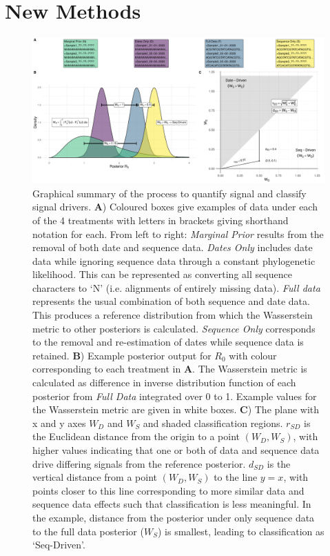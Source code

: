 \documentclass{article}
\begin{document}
\section*{New Methods}

\begin{figure}[H]
\centering
\includegraphics[width=1\linewidth]{../figures/graphicalMethods.pdf}
\caption{Graphical summary of the process to quantify signal and classify signal drivers.  \textbf{A}) Coloured boxes give examples of data under each of the 4 treatments with letters in brackets giving shorthand notation for each. From left to right: \emph{Marginal Prior} results from the removal of both date and sequence data. \emph{Dates Only} includes date data while ignoring sequence data through a constant phylogenetic likelihood. This can be represented as converting all sequence characters to `N' (i.e. alignments of entirely missing data). \emph{Full data} represents the usual combination of both sequence and date data. This produces a reference distribution from which the Wasserstein metric to other posteriors is calculated. \emph{Sequence Only} corresponds to the removal and re-estimation of dates while sequence data is retained. \textbf{B}) Example posterior output for $R_0$ with colour corresponding to each treatment in \textbf{A}. The Wasserstein metric is calculated as difference in inverse distribution function of each posterior from \emph{Full Data} integrated over 0 to 1. Example values for the Wasserstein metric are given in white boxes. \textbf{C}) The plane with x and y axes $W_D$ and $W_S$ and shaded classification regions. $r_{SD}$ is the Euclidean distance from the origin to a point $(W_D, W_S)$, with higher values indicating that one or both of data and sequence data drive differing signals from the reference posterior. $d_{SD}$ is the vertical distance from a point $(W_D, W_S)$ to the line $y=x$, with points closer to this line corresponding to more similar data and sequence data effects such that classification is less meaningful. In the example, distance from the posterior under only sequence data to the full data posterior ($W_S$) is smallest, leading to classification as `Seq-Driven'.}
\label{fig:method}
\end{figure}
\end{document}
